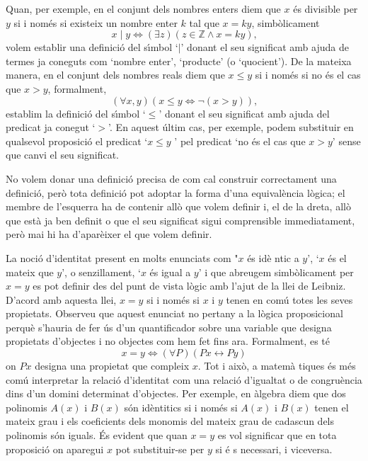 Quan, per exemple, en el conjunt dels nombres enters diem que $x$ \'{e}s
divisible per $y$ si i nom\'{e}s si existeix un nombre enter $k$ tal que $%
x=ky$, simb\`{o}licament%
\begin{equation*}
x\mid y\Longleftrightarrow\left( \exists z\right) \left( z\in \mathbb{Z}%
\wedge x=ky\right) \text{,}
\end{equation*}
volem establir una definici\'{o} del s\'{\i}mbol `$\mid$' donant el seu
significat amb ajuda de termes ja coneguts com `nombre enter', `producte' (o
`quocient'). De la mateixa manera, en el conjunt dels nombres reals diem que
$x\leq y$ si i nom\'{e}s si no \'{e}s el cas que $x>y$, formalment,
\begin{equation*}
\left( \forall x,y\right) \left( x\leq y\Longleftrightarrow\lnot\left(
x>y\right) \right) \text{,}
\end{equation*}
establim la definici\'{o} del s\'{\i}mbol `$\leq$' donant el seu significat
amb ajuda del predicat ja conegut `$>$'. En aquest \'{u}ltim cas, per
exemple, podem substituir en qualsevol proposici\'{o} el predicat `$x\leq y$%
' pel predicat `no \'{e}s el cas que $x>y$' sense que canvi el seu
significat.

\bigskip

No volem donar una definici\'{o} precisa de com cal construir correctament
una definici\'{o}, per\`{o} tota definici\'{o} pot adoptar la forma d'una
equival\`{e}ncia l\`{o}gica; el membre de l'esquerra ha de contenir all\`{o}
que volem definir i, el de la dreta, all\`{o} que est\`{a} ja ben definit o
que el seu significat sigui comprensible immediatament, per\`{o} mai hi ha
d'apar\`{e}ixer el que volem definir.

\bigskip

La noci\'{o} d'identitat present en molts enunciats com "$x$ \'{e}s id\`{e}%
ntic a $y$', `$x$ \'{e}s el mateix que $y$', o senzillament, `$x$ \'{e}s
igual a $y$' i que abreugem simb\`{o}licament per $x=y$ es pot definir des
del punt de vista l\`{o}gic amb l'ajut de la llei de Leibniz. D'acord amb
aquesta llei, $x=y$ si i nom\'{e}s si $x$ i $y$ tenen en com\'{u} totes les
seves propietats. Observeu que aquest enunciat no pertany a la l\`{o}gica
proposicional perqu\`{e} s'hauria de fer \'{u}s d'un quantificador sobre una
variable que designa propietats d'objectes i no objectes com hem fet fins
ara. Formalment, es t\'{e}%
\begin{equation*}
x=y\Longleftrightarrow\left( \forall P\right) \left( Px\longleftrightarrow
Py\right)
\end{equation*}
on $Px$ designa una propietat que compleix $x$. Tot i aix\`{o}, a matem\`{a}%
tiques \'{e}s m\'{e}s com\'{u} interpretar la relaci\'{o} d'identitat com
una relaci\'{o} d'igualtat o de congru\`{e}ncia dins d'un domini determinat
d'objectes. Per exemple, en \`{a}lgebra diem que dos polinomis $A(x)$ i $%
B(x) $ s\'{o}n id\`{e}ntitics si i nom\'{e}s si $A(x)$ i $B(x)$ tenen el
mateix grau i els coeficients dels monomis del mateix grau de cadascun dels
polinomis s\'{o}n iguals. \'{E}s evident que quan $x=y$ es vol significar
que en tota proposici\'{o} on aparegui $x$ pot substituir-se per $y$ si \'{e}%
s necessari, i viceversa.


